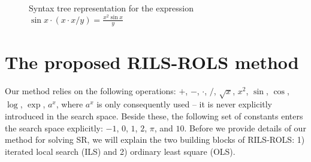 \documentclass{bmcart}
\begin{document}
	\begin{figure}[!ht]
	\centering
	
	\caption{Syntax tree representation for the expression $\sin{x} \cdot   ( x \cdot  x / y  )  = \frac{x^2 \sin x }{y}$}
	\label{fig:syntax-tree-example}
\end{figure}

	\section{The proposed RILS-ROLS method}\label{sec:rils}

Our method relies on the following operations: $+$, $-$, $\cdot$, $/$, $\sqrt{x}$, $x^2 $, $\sin$, $\cos$, $\log$, $\exp$, $a^x$, where $a^x$ is only consequently used -- it is never explicitly introduced in the search space. Beside these, the following set of constants enters the search space explicitly: $-1$, $0$, $1$, $2$, $\pi$, and $10$. 
Before we provide details of our method for solving SR, we will explain the two building blocks of \textsc{RILS-ROLS}: 1) iterated local search (ILS) and 2) ordinary least square (OLS). 
\end{document}
